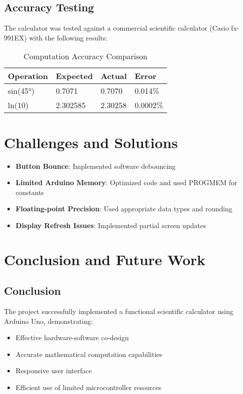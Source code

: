 \documentclass[journal]{IEEEtran}
\begin{document}
\subsection{Accuracy Testing}
The calculator was tested against a commercial scientific calculator (Casio fx-991EX) with the following results:
\begin{table}[H]
\centering
\caption{Computation Accuracy Comparison}
\begin{tabular}{|l|l|l|l|}
\hline
\textbf{Operation} & \textbf{Expected} & \textbf{Actual} & \textbf{Error} \\ \hline
sin(45°) & 0.7071 & 0.7070 & 0.014\% \\ \hline
ln(10) & 2.302585 & 2.30258 & 0.0002\% \\ \hline

\end{tabular}
\end{table}

\section{Challenges and Solutions}
\begin{itemize}
    \item \textbf{Button Bounce}: Implemented software debouncing
    \item \textbf{Limited Arduino Memory}: Optimized code and used PROGMEM for constants
    \item \textbf{Floating-point Precision}: Used appropriate data types and rounding
    \item \textbf{Display Refresh Issues}: Implemented partial screen updates
\end{itemize}

\section{Conclusion and Future Work}
\subsection{Conclusion}
The project successfully implemented a functional scientific calculator using Arduino Uno, demonstrating:
\begin{itemize}
    \item Effective hardware-software co-design
    \item Accurate mathematical computation capabilities
    \item Responsive user interface
    \item Efficient use of limited microcontroller resources
\end{itemize}
\end{document}
